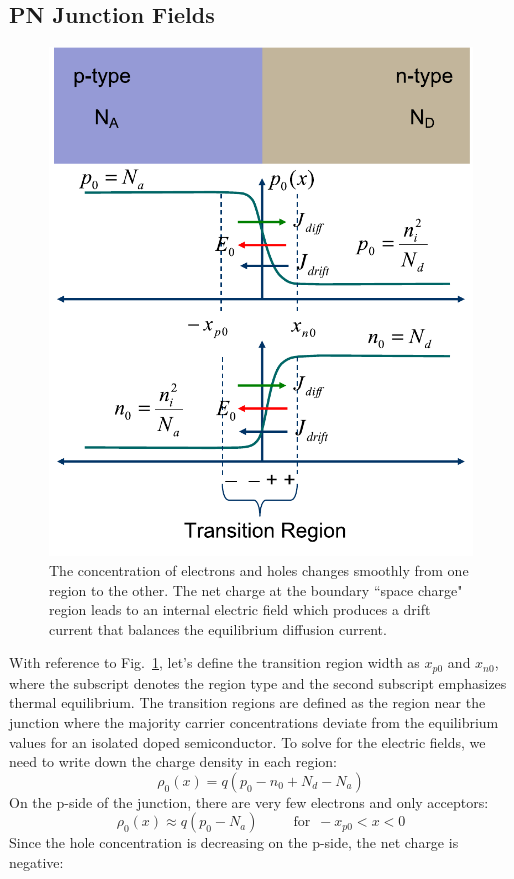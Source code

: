 \subsection{PN Junction Fields}
\begin{figure}[tb]
\centering
\includegraphics[width=.5\columnwidth]{slide11}
\caption{The concentration of electrons and holes changes smoothly from one region to the other.  The net charge at the boundary ``space charge" region leads to an internal electric field which produces a drift current that balances the equilibrium diffusion current.}
\label{fig:slide11}
\end{figure}
With reference to Fig.~\ref{fig:slide11}, let's define the transition region width as $x_{p0}$ and $x_{n0}$, where the subscript denotes the region type and the second subscript emphasizes thermal equilibrium.   The transition regions are defined as the region near the junction where the majority carrier concentrations deviate from the equilibrium values for an isolated doped semiconductor.    To solve for the electric fields, we need to write down the charge density in each region:
    \begin{equation} 
        {\rho _0}(x) = q({p_0} - {n_0} + {N_d} - {N_a}) 
    \end{equation}
On the p-side of the junction, there are very few electrons and only acceptors:
    \begin{equation} 
        {\rho _0}(x) \approx q({p_0} - {N_a}) \,\,\,\quad\quad \text{for}\,\,\,  - {x_{p0}} < x < 0 
    \end{equation}
Since the hole concentration is decreasing on the p-side, the net charge is negative:
